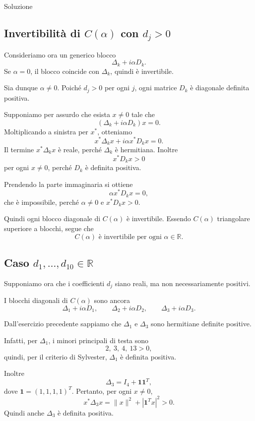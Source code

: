 \documentclass[a4paper]{article}
\begin{document}
\begin{snippetsolution}{Soluzione}
    \subsection*{Invertibilità di \(C(\alpha)\) con \(d_j>0\)}

    Consideriamo ora un generico blocco
    \[
        \Delta_k+i\alpha D_k.
    \]
    Se \(\alpha=0\), il blocco coincide con \(\Delta_k\), quindi è invertibile.

    Sia dunque \(\alpha\neq 0\). Poiché \(d_j>0\) per ogni \(j\), ogni matrice \(D_k\) è diagonale definita positiva.

    Supponiamo per assurdo che esista \(x\neq 0\) tale che
    \[
        (\Delta_k+i\alpha D_k)x=0.
    \]
    Moltiplicando a sinistra per \(x^*\), otteniamo
    \[
        x^*\Delta_kx+i\alpha x^*D_kx=0.
    \]
    Il termine \(x^*\Delta_kx\) è reale, perché \(\Delta_k\) è hermitiana. Inoltre
    \[
        x^*D_kx>0
    \]
    per ogni \(x\neq 0\), perché \(D_k\) è definita positiva.

    Prendendo la parte immaginaria si ottiene
    \[
        \alpha x^*D_kx=0,
    \]
    che è impossibile, perché \(\alpha\neq 0\) e \(x^*D_kx>0\).

    Quindi ogni blocco diagonale di \(C(\alpha)\) è invertibile. Essendo \(C(\alpha)\) triangolare superiore a blocchi, segue che
    \[
        C(\alpha) \text{ è invertibile per ogni } \alpha\in\mathbb{R}.
    \]

    \subsection*{Caso \(d_1,\dots,d_{10}\in\mathbb{R}\)}

    Supponiamo ora che i coefficienti \(d_j\) siano reali, ma non necessariamente positivi.

    I blocchi diagonali di \(C(\alpha)\) sono ancora
    \[
        \Delta_1+i\alpha D_1,
        \qquad
        \Delta_2+i\alpha D_2,
        \qquad
        \Delta_3+i\alpha D_3.
    \]

    Dall'esercizio precedente sappiamo che \(\Delta_1\) e \(\Delta_3\) sono hermitiane definite positive.

    Infatti, per \(\Delta_1\), i minori principali di testa sono
    \[
        2,\ 3,\ 4,\ 13>0,
    \]
    quindi, per il criterio di Sylvester, \(\Delta_1\) è definita positiva.

    Inoltre
    \[
        \Delta_3=I_4+\mathbf{1}\mathbf{1}^T,
    \]
    dove \(\mathbf{1}=(1,1,1,1)^T\). Pertanto, per ogni \(x\neq 0\),
    \[
        x^*\Delta_3x
        =
        \|x\|^2+\left|\mathbf{1}^Tx\right|^2>0.
    \]
    Quindi anche \(\Delta_3\) è definita positiva.


\end{snippetsolution}
\end{document}
